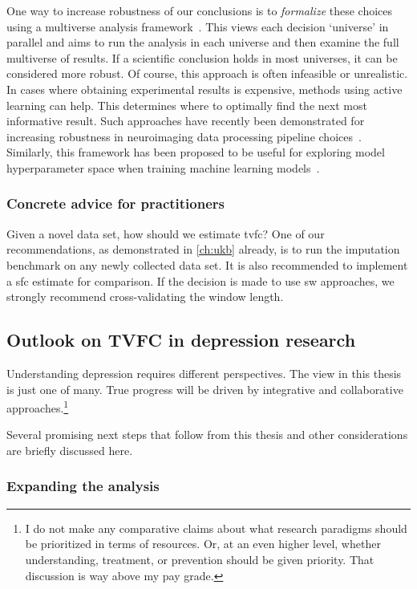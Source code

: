 One way to increase robustness of our conclusions is to \emph{formalize} these choices using a multiverse analysis framework~\parencite{Steegen2016}.
This views each decision `universe' in parallel and aims to run the analysis in each universe and then examine the full multiverse of results.
If a scientific conclusion holds in most universes, it can be considered more robust.
Of course, this approach is often infeasible or unrealistic.
In cases where obtaining experimental results is expensive, methods using active learning can help.
This determines where to optimally find the next most informative result.
Such approaches have recently been demonstrated for increasing robustness in neuroimaging data processing pipeline choices~\parencite{Dafflon2022}.
Similarly, this framework has been proposed to be useful for exploring model hyperparameter space when training machine learning models~\parencite{Bell2022}.

\subsubsection{Concrete advice for practitioners}

Given a novel data set, how should we estimate \gls{tvfc}?
One of our recommendations, as demonstrated in \cref{ch:ukb} already, is to run the imputation benchmark on any newly collected data set.
It is also recommended to implement a \gls{sfc} estimate for comparison.
If the decision is made to use \gls{sw} approaches, we strongly recommend cross-validating the window length.

\subsection{Outlook on TVFC in depression research}\label{subsec:outlook-depression}

Understanding depression requires different perspectives.
The view in this thesis is just one of many.
True progress will be driven by integrative and collaborative approaches.\footnote{I do not make any comparative claims about what research paradigms should be prioritized in terms of resources. Or, at an even higher level, whether understanding, treatment, or prevention should be given priority. That discussion is way above my pay grade.}

Several promising next steps that follow from this thesis and other considerations are briefly discussed here.

\subsubsection{Expanding the analysis}

